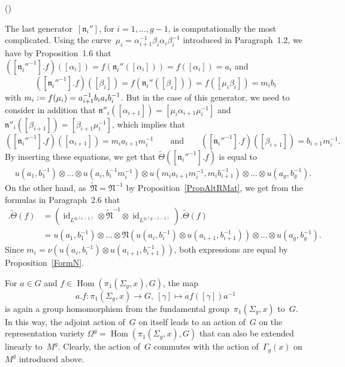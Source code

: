 \documentclass[12pt]{article}
\makeatletter
\newcounter{num}
\newenvironment{pflist}{\begin{list}{(\arabic{num})}{\usecounter{num} \leftmargin0cm \itemindent5pt}}{\end{list}}
\theoremstyle{definition}
\theoremstyle{break}
\renewenvironment{proof}[1][\proofname]{\par
\vspace{-5pt}%
\pushQED{\qed}%
\normalfont
\topsep0pt \partopsep0pt %
\trivlist
\item[\hskip\labelsep
\bfseries
#1\@addpunct{.}]\ignorespaces
}{%
\popQED\endtrivlist\@endpefalse
\addvspace{6pt plus 6pt} %
}
\DeclareMathOperator\Hom{Hom}
\DeclareMathOperator\id{id}
\newcommand{\fN}{\mathfrak{N}}
\newcommand{\fn}{\mathfrak{n}}
\renewcommand{\1}{\mathbbm{1}}
\newcommand{\ot}{\mathbin{\otimes}}
\newcommand{\uu}{u}
\newcommand{\deq}{\vcentcolon =}
\makeatother
\begin{document}
\begin{proof}
\begin{pflist}
\item
The last generator~$[\fn_i'']$, for $i=1,\dots, g-1$, is computationally the most complicated. Using the curve~$\mu_{i} = \alpha_{i+1}^{-1} \beta_i \alpha_i \beta_i^{-1}$ introduced in Paragraph~1.2, we have by Proposition~1.6 that
$([\fn_i''^{-1}].f)([\alpha_i]) = f(\fn_i''([\alpha_i])) = f([\alpha_i]) = a_i$
and
\[([\fn_i''^{-1}].f)([\beta_i]) = f(\fn_i''([\beta_i])) = f([\mu_i \beta_i])
= m_i b_i\]
with $m_i \deq f(\mu_i) = a_{i+1}^{-1} b_i a_i b_i^{-1}$. But in the case of this generator, we need to consider in addition that
$\fn''_i([\alpha_{i+1}]) = [\mu_i \alpha_{i+1} \mu_i^{-1}]$ and
$\fn''_i([\beta_{i+1}]) = [\beta_{i+1} \mu_i^{-1}]$, which implies that
\[([\fn_i''^{-1}].f)([\alpha_{i+1}]) = m_i a_{i+1} m_i^{-1}
\qquad \text{and} \qquad
([\fn_i''^{-1}].f)([\beta_{i+1}]) = b_{i+1} m_i^{-1}.\]
By inserting these equations, we get that $\tilde{\Theta}([\fn_i''^{-1}].f)$ is equal to
\begin{align*}
&\uu(a_1,b_1^{-1}) \ot \dots \ot \uu(a_i,b_i^{-1} m_i^{-1})
\ot \uu(m_i a_{i+1} m_i^{-1}, m_i b_{i+1}^{-1}) \ot \dots \ot \uu(a_g,b_g^{-1}).
\end{align*}
On the other hand, as~$\tilde{\fN} = \fN^{-1}$ by Proposition~\ref{PropAltRMat}, we get from the formulas in Paragraph~2.6 that
\begin{align*}
[\fn_i''^{-1}].\tilde{\Theta}(f) &=
(\id_{L^{\ot (i-1)}} \ot \tilde{\fN}^{-1} \ot \id_{L^{\ot (g-i-1)}}).\tilde{\Theta}(f) \\
&=
\uu(a_1,b_1^{-1}) \ot \dots \ot
\fN(\uu(a_i,b_i^{-1}) \ot \uu(a_{i+1},b_{i+1}^{-1})) \ot \dots \ot \uu(a_g,b_g^{-1}).
\end{align*}
Since $m_i = \nu(\uu(a_i,b_i^{-1}) \ot \uu(a_{i+1},b_{i+1}^{-1}))$, both expressions are equal by Proposition~\ref{FormN}.
\qedhere
\end{pflist}
\end{proof}

For $a \in G$ and $f \in \Hom(\pi_1(\Sigma_{g},x),G)$, the map
\[a.f \colon \pi_1(\Sigma_{g},x) \to G,~[\gamma] \mapsto a f([\gamma]) a^{-1}\]
is again a group homomorphism from the fundamental group~$\pi_1(\Sigma_{g},x)$ to~$G$. In this way, the adjoint action of~$G$ on itself leads to an action of~$G$
on the representation variety $\Omega^g = \Hom(\pi_1(\Sigma_{g},x),G)$ that can also be extended linearly to~$M^g$. Clearly, the action of~$G$ commutes with the action of~$\Gamma_{g}(x)$ on~$M^g$ introduced above.
\end{document}
